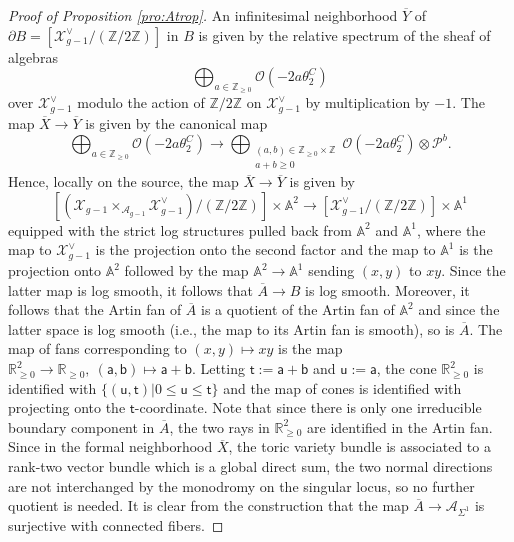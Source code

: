\documentclass[11pt]{article}
\newcommand{\barA}{\overline{A}}
\theoremstyle{definition}
\begin{document}
\begin{proof}[Proof of Proposition \ref{pro:Atrop}]
	An infinitesimal neighborhood $\overline{Y}$ of $\partial B=[\mathcal{X}_{g-1}^{\vee}/(\mathbb{Z}/2\mathbb{Z})]$ in $B$ is given by the relative spectrum of
	the sheaf of algebras
	$$\bigoplus_{a\in \mathbb{Z}_{\ge 0}}\mathcal{O}(-2a\theta_2^C)$$
	over $\mathcal{X}_{g-1}^{\vee}$ modulo the action of $\mathbb{Z}/2\mathbb{Z}$ on $\mathcal{X}_{g-1}^{\vee}$ by multiplication by
	$-1$. The map $\overline{X}\to \overline{Y}$ is given by the canonical map
	$$\bigoplus_{a\in \mathbb{Z}_{\ge 0}}\mathcal{O}(-2a\theta_2^C)\to \bigoplus_{\substack{(a,b)\in \mathbb{Z}_{\ge 0}\times\mathbb{Z}\\a+b\ge 0}}\mathcal{O}(-2a\theta_2^C)\otimes \mathcal{P}^{b}.$$
	Hence, locally on the source, the map $\overline{X}\to \overline{Y}$ is given by
	$$[(\mathcal{X}_{g-1}\times_{\mathcal{A}_{g-1}}\mathcal{X}_{g-1}^{\vee})/(\mathbb{Z}/2\mathbb{Z})]\times\mathbb{A}^{2}\to [\mathcal{X}_{g-1}^{\vee}/(\mathbb{Z}/2\mathbb{Z})]\times\mathbb{A}^{1}$$
	equipped with the strict log structures pulled back from $\mathbb{A}^{2}$ and $\mathbb{A}^{1}$,
	where the map to $\mathcal{X}_{g-1}^{\vee}$ is the projection onto the second factor and the map to $\mathbb{A}^{1}$ is the projection
	onto $\mathbb{A}^{2}$ followed by the map $\mathbb{A}^{2}\to \mathbb{A}^{1}$ sending $(x,y)$ to $xy$. Since the latter map is log smooth,
	it follows that $\barA\to B$ is log smooth. Moreover, it follows that
	the Artin fan of $\barA$ is a quotient of the Artin fan of $\mathbb{A}^{2}$ and since the latter space is log smooth (i.e.,
	the map to its Artin fan is smooth), so is $\barA$. The map of fans corresponding to $(x,y)\mapsto xy$ is the map
	$\mathbb{R}_{\ge 0}^{2}\to \mathbb{R}_{\ge 0},\ (\mathsf{a},\mathsf{b})\mapsto \mathsf{a}+\mathsf{b}$. Letting $\mathsf{t}:=\mathsf{a}+\mathsf{b}$ and $\mathsf{u}:=\mathsf{a}$, the cone $\mathbb{R}_{\ge 0}^{2}$ is
	identified with $\{(\mathsf{u},\mathsf{t})|0\le \mathsf{u}\le \mathsf{t}\}$ and the map of cones is identified with projecting onto the $\mathsf{t}$-coordinate. Note that since
	there is only one irreducible boundary component in $\barA$, the two rays in $\mathbb{R}_{\ge 0}^{2}$ are identified in the Artin fan.
	Since in the formal neighborhood $\overline{X}$, the toric variety bundle is associated to a rank-two vector bundle which is a global
	direct sum, the two normal directions are not interchanged by the monodromy on the singular locus, so no further quotient is needed.
	It is clear from the construction that the map $\barA\to \mathcal A_{\Sigma^1}$ is surjective with connected fibers.
\end{proof}
\end{document}
